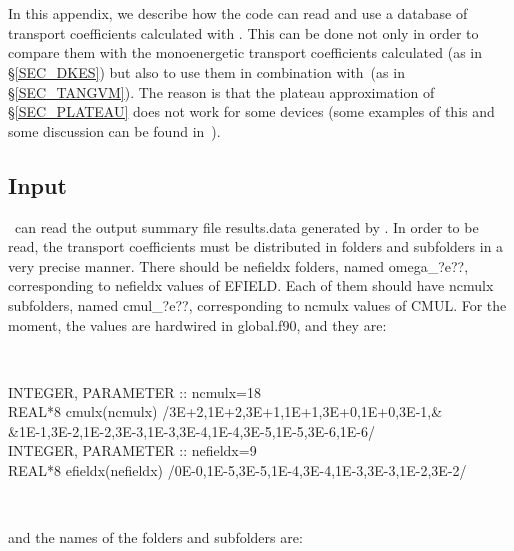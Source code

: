 \chapter{\DKES}\label{CHAP_DKES}

In this appendix, we describe how the code can read and use a database of transport coefficients calculated with \DKES. This can be done not only in order to compare them with the monoenergetic transport coefficients calculated (as in \S\ref{SEC_DKES}) but also to use them in combination with~\KNOSOS (as in \S\ref{SEC_TANGVM}). The reason is that the plateau approximation of \S\ref{SEC_PLATEAU} does not work for some devices (some examples of this and some discussion can be found in~\citep{beidler2011icnts}).


\section{Input}\label{SEC_IDKES}

\KNOSOS~can read the output summary file {\ttfamily results.data} generated by \DKES. In order to be read, the transport coefficients must be distributed in folders and subfolders in a very precise manner. There should be {\ttfamily nefieldx} folders, named {\ttfamily omega\_?e??}, corresponding to  {\ttfamily nefieldx} values of {\ttfamily EFIELD}. Each of them should have  {\ttfamily ncmulx} subfolders, named {\ttfamily cmul\_?e??}, corresponding to  {\ttfamily ncmulx} values of {\ttfamily CMUL}. For the moment, the values are hardwired in {\ttfamily global.f90}, and they are:

\

{\ttfamily
\hskip-0.6cm INTEGER, PARAMETER :: ncmulx=18 \\
REAL*8 cmulx(ncmulx) /3E+2,1E+2,3E+1,1E+1,3E+0,1E+0,3E-1,\&\\ \&1E-1,3E-2,1E-2,3E-3,1E-3,3E-4,1E-4,3E-5,1E-5,3E-6,1E-6/\\
INTEGER, PARAMETER :: nefieldx=9\\
REAL*8 efieldx(nefieldx) /0E-0,1E-5,3E-5,1E-4,3E-4,1E-3,3E-3,1E-2,3E-2/}

\

\hskip-0.6cm and the names of the folders and subfolders are:

\

